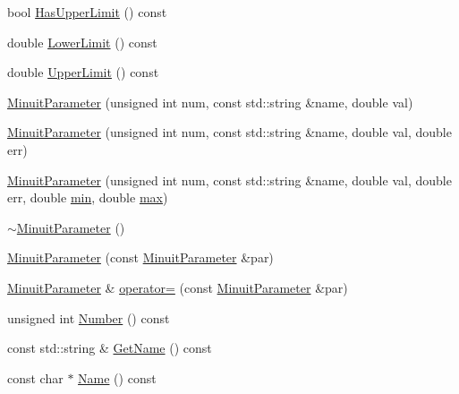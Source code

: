 \begin{DoxyCompactItemize}
\item 
bool \mbox{\hyperlink{classROOT_1_1Minuit2_1_1MinuitParameter_a821e242fbbf23461e3b66a59126f3f02}{Has\+Upper\+Limit}} () const
\item 
double \mbox{\hyperlink{classROOT_1_1Minuit2_1_1MinuitParameter_a25c7f30fc42264f1df96a3852d2e11a4}{Lower\+Limit}} () const
\item 
double \mbox{\hyperlink{classROOT_1_1Minuit2_1_1MinuitParameter_a285e254a9574807222d2a74bb05e18d9}{Upper\+Limit}} () const
\item 
\mbox{\hyperlink{classROOT_1_1Minuit2_1_1MinuitParameter_afa9a57b4990491316502a21e09b756bc}{Minuit\+Parameter}} (unsigned int num, const std\+::string \&name, double val)
\item 
\mbox{\hyperlink{classROOT_1_1Minuit2_1_1MinuitParameter_a56d290ba2abc3c599cff99187329a91a}{Minuit\+Parameter}} (unsigned int num, const std\+::string \&name, double val, double err)
\item 
\mbox{\hyperlink{classROOT_1_1Minuit2_1_1MinuitParameter_a13b433906347405bf85ef2bdf5803990}{Minuit\+Parameter}} (unsigned int num, const std\+::string \&name, double val, double err, double \mbox{\hyperlink{adat__devel_2lib_2SU3_2SU3__internal_8h_ab0f5fed3171eb00d1c5f037d9f518a23}{min}}, double \mbox{\hyperlink{adat__devel_2lib_2SU3_2SU3__internal_8h_ace7f45ceb252a2dfbf29b98bc81cb8ba}{max}})
\item 
\mbox{\hyperlink{classROOT_1_1Minuit2_1_1MinuitParameter_a487d895f06a46c8c2e1e3dbc97dd0a26}{$\sim$\+Minuit\+Parameter}} ()
\item 
\mbox{\hyperlink{classROOT_1_1Minuit2_1_1MinuitParameter_a0ac95809b18c619597764fcfabcb70fe}{Minuit\+Parameter}} (const \mbox{\hyperlink{classROOT_1_1Minuit2_1_1MinuitParameter}{Minuit\+Parameter}} \&par)
\item 
\mbox{\hyperlink{classROOT_1_1Minuit2_1_1MinuitParameter}{Minuit\+Parameter}} \& \mbox{\hyperlink{classROOT_1_1Minuit2_1_1MinuitParameter_ae26eba9113194d198e988d7c87057398}{operator=}} (const \mbox{\hyperlink{classROOT_1_1Minuit2_1_1MinuitParameter}{Minuit\+Parameter}} \&par)
\item 
unsigned int \mbox{\hyperlink{classROOT_1_1Minuit2_1_1MinuitParameter_aaa2361c2954576d90a0dffcf2e049eea}{Number}} () const
\item 
const std\+::string \& \mbox{\hyperlink{classROOT_1_1Minuit2_1_1MinuitParameter_adc67abcb32783aed362068ee38cb24b7}{Get\+Name}} () const
\item 
const char $\ast$ \mbox{\hyperlink{classROOT_1_1Minuit2_1_1MinuitParameter_a151958b5dbcc194a090753e0b2605fbc}{Name}} () const

\end{DoxyCompactItemize}
